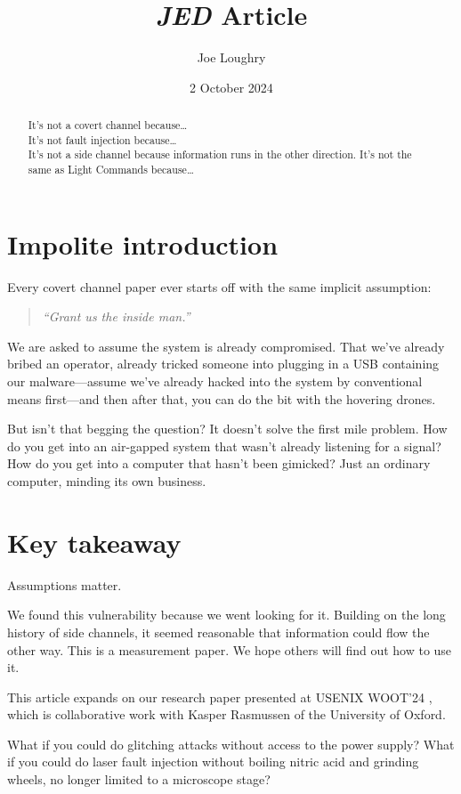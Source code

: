 \documentclass[letterpaper]{article}
\date{2 October 2024}
\title{\emph{JED} Article}
\author{Joe Loughry}
\begin{document}
\maketitle
\begin{abstract}
It's not a covert channel because\ldots \\
It's not fault injection because\ldots \\
It's not a side channel because information runs in the other direction.
It's not the same as Light Commands because\ldots
\end{abstract}
\section{Impolite introduction}
Every covert channel paper ever starts off with the same implicit assumption:
\begin{quote}
{\it ``Grant us the inside man.''}
\end{quote}

\noindent We are asked to assume the system is already compromised. That we've
already bribed an operator, already tricked someone into plugging in a USB
containing our malware---assume we've already hacked into the system by
conventional means first---and then after that, you can do the bit with the
hovering drones.

But isn't that begging the question? It doesn't solve the first mile problem.
How do you get into an air-gapped system that wasn't already listening for a
signal? How do you get into a computer that hasn't been gimicked? Just an
ordinary computer, minding its own business.

\section{Key takeaway}

Assumptions matter.

We found this vulnerability because we went looking for it. Building on the
long history of side channels, it seemed reasonable that information could flow
the other way. This is a measurement paper. We hope others will find out how to
use it.

This article expands on our research paper presented at USENIX WOOT'24
\cite{Loughry2024b}, which is collaborative work with Kasper Rasmussen of the
University of Oxford.

What if you could do glitching attacks without access to the power supply? What
if you could do laser fault injection without boiling nitric acid and grinding
wheels, no longer limited to a microscope stage?
\end{document}
